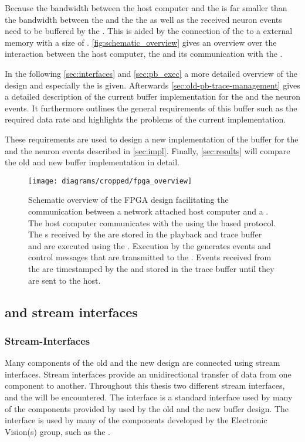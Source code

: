 Because the bandwidth between the host computer and the \FPGA{} is far smaller than the bandwidth between the \FPGA{} and the \ASIC{} the \PlaybackProgram{} as well as the received neuron events need to be buffered by the \FPGA{}. This is aided by the connection of the \FPGA{} to a external \DDR{} memory with a size of \DDRSIZE{}.
\autoref{fig:schematic_overview} gives an overview over the interaction between the host computer, the \FPGA{} and its communication with the \HICANNX{} \ASIC{}.

In the following \autoref{sec:interfaces} and \autoref{sec:pb_exec} a more detailed overview of the \FPGA{} design and especially the \pbexec{} is given. Afterwards \autoref{sec:old-pb-trace-management} gives a detailed description of the current buffer implementation for the \PlaybackProgram{} and the neuron events. It furthermore outlines the general requirements of this buffer such as the required data rate and highlights the problems of the current implementation.

These requirements are used to design a new implementation of the buffer for the \PlaybackProgram{} and the neuron events described in \autoref{sec:impl}. Finally, \autoref{sec:results} will compare the old and new buffer implementation in detail.

\begin{figure}
\centerline{\texttt{[image: diagrams/cropped/fpga\_overview]}}
\caption{Schematic overview of the FPGA design facilitating the communication between a network attached host computer and a \HICANNX{} \ASIC{}. The host computer communicates with the \FPGA{} using the \UDP{} based \HostARQ{} protocol. The \PlaybackProgram{}s received by the \FPGA{} are stored in the playback and trace buffer and are executed using the \pbexec{}. Execution by the \pbexec{} generates events and control messages that are transmitted to the \ASIC{}. Events received from the \ASIC{} are timestamped by the \pbexec{} and stored in the trace buffer until they are sent to the host.}\label{fig:schematic_overview}
\end{figure}


\subsection{\AXI{} and stream interfaces}\label{sec:interfaces}
\subsubsection{Stream-Interfaces}
Many components of the old and the new \FPGA{} design are connected using stream interfaces. Stream interfaces provide an unidirectional transfer of data from one component to another.
Throughout this thesis two different stream interfaces, \AXIStream{} and the \ValidNextStream{} will be encountered.
The \AXIStream{} interface is a standard interface used by many of the components provided by \Xilinx{} used by the old and the new buffer design. The \ValidNextStream{} interface is used by many of the components developed by the Electronic Vision(s) group, such as the \pbexec{}.

